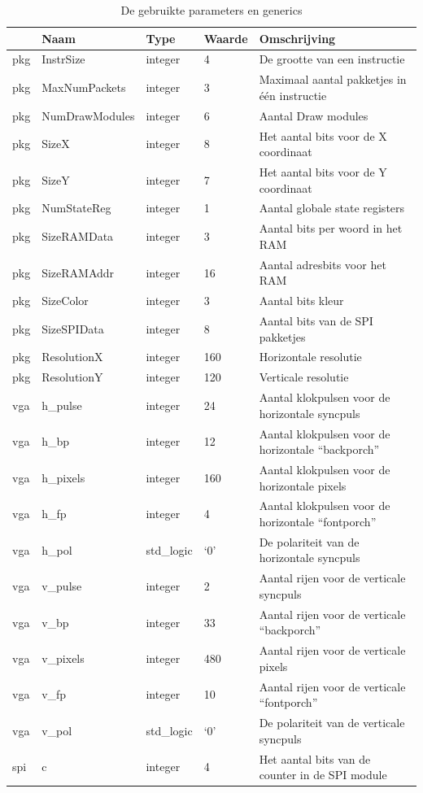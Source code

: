 \documentclass{scrreprt} %
\begin{document}
\begin{table}[H]
\centering
\caption{De gebruikte parameters en generics}
\label{tab:spec-params}
\begin{tabular}{l l l l l}
	\hline\hline
 	 & Naam & Type & Waarde & Omschrijving\\
 	\hline
	pkg & InstrSize & integer & 4 & De grootte van een instructie\\ 
	pkg & MaxNumPackets & integer & 3 & Maximaal aantal pakketjes in één instructie\\ 
	pkg & NumDrawModules & integer & 6 & Aantal Draw modules\\ 
	pkg & SizeX & integer & 8 & Het aantal bits voor de X coordinaat\\
	pkg & SizeY & integer & 7 & Het aantal bits voor de Y coordinaat\\
	pkg & NumStateReg & integer & 1 & Aantal globale state registers\\
	pkg & SizeRAMData & integer & 3 & Aantal bits per woord in het RAM\\
	pkg & SizeRAMAddr & integer & 16 & Aantal adresbits voor het RAM\\
	pkg & SizeColor & integer & 3 & Aantal bits kleur\\
	pkg & SizeSPIData & integer & 8 & Aantal bits van de SPI pakketjes\\
	pkg & ResolutionX & integer & 160 & Horizontale resolutie \\
	pkg & ResolutionY & integer & 120 & Verticale resolutie \\
	vga & h\_pulse & integer & 24 & Aantal klokpulsen voor de horizontale syncpuls\\ 
	vga & h\_bp & integer & 12 & Aantal klokpulsen voor de horizontale “backporch” \\ 
	vga & h\_pixels & integer & 160 & Aantal klokpulsen voor de horizontale pixels \\ 
	vga & h\_fp & integer & 4 & Aantal klokpulsen voor de horizontale “fontporch” \\ 
	vga & h\_pol & std\_logic & ‘0’ & De polariteit van de horizontale syncpuls\\ 
	vga & v\_pulse & integer & 2 & Aantal rijen voor de verticale syncpuls\\ 
	vga & v\_bp & integer & 33 & Aantal rijen voor de verticale “backporch” \\ 
	vga & v\_pixels & integer & 480 & Aantal rijen voor de verticale pixels\\ 
	vga & v\_fp & integer & 10 & Aantal rijen voor de verticale “fontporch” \\ 
	vga & v\_pol & std\_logic & ‘0’ & De polariteit van de verticale syncpuls\\ 
	spi & c & integer & 4 & Het aantal bits van de counter in de SPI module\\
  	\hline
\end{tabular}
\end{table}
\end{document}
